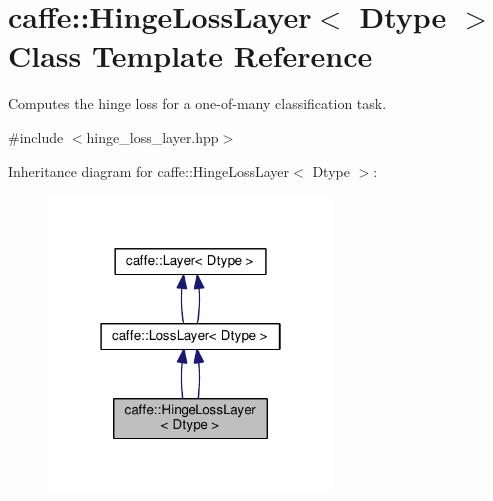 \hypertarget{classcaffe_1_1_hinge_loss_layer}{}\section{caffe\+:\+:Hinge\+Loss\+Layer$<$ Dtype $>$ Class Template Reference}
\label{classcaffe_1_1_hinge_loss_layer}


Computes the hinge loss for a one-\/of-\/many classification task.  




{\ttfamily \#include $<$hinge\+\_\+loss\+\_\+layer.\+hpp$>$}



Inheritance diagram for caffe\+:\+:Hinge\+Loss\+Layer$<$ Dtype $>$\+:
\nopagebreak
\begin{figure}[H]
\begin{center}
\leavevmode
\includegraphics[width=214pt]{classcaffe_1_1_hinge_loss_layer__inherit__graph}
\end{center}
\end{figure}
